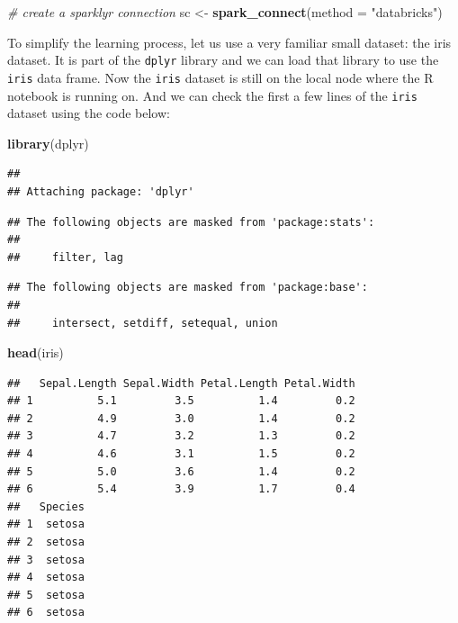 \documentclass[12pt,]{krantz}
\makeatletter
\newenvironment{Shaded}{\begin{snugshade}}{\end{snugshade}}
\newcommand{\CommentTok}[1]{\textcolor[rgb]{0.37,0.37,0.37}{\textit{#1}}}
\newcommand{\DataTypeTok}[1]{\textcolor[rgb]{0.27,0.27,0.27}{#1}}
\newcommand{\KeywordTok}[1]{\textcolor[rgb]{0.27,0.27,0.27}{\textbf{#1}}}
\newcommand{\NormalTok}[1]{#1}
\newcommand{\StringTok}[1]{\textcolor[rgb]{0.5,0.5,0.5}{#1}}
\newenvironment{kframe}{%
\medskip{}
\setlength{\fboxsep}{.8em}
 \def\at@end@of@kframe{}%
 \ifinner\ifhmode%
  \def\at@end@of@kframe{\end{minipage}}%
  \begin{minipage}{\columnwidth}%
 \fi\fi%
 \def\FrameCommand##1{\hskip\@totalleftmargin \hskip-\fboxsep
 \colorbox{shadecolor}{##1}\hskip-\fboxsep
     \hskip-\linewidth \hskip-\@totalleftmargin \hskip\columnwidth}%
 \MakeFramed {\advance\hsize-\width
   \@totalleftmargin\z@ \linewidth\hsize
   \@setminipage}}%
 {\par\unskip\endMakeFramed%
 \at@end@of@kframe}
\renewenvironment{Shaded}{\begin{kframe}}{\end{kframe}}
\makeatother
\begin{document}
\begin{Shaded}
\begin{Highlighting}[]
\CommentTok{# create a sparklyr connection}
\NormalTok{sc <-}\StringTok{ }\KeywordTok{spark_connect}\NormalTok{(}\DataTypeTok{method =} \StringTok{"databricks"}\NormalTok{)}
\end{Highlighting}
\end{Shaded}

To simplify the learning process, let us use a very familiar small dataset: the iris dataset. It is part of the \texttt{dplyr} library and we can load that library to use the \texttt{iris} data frame. Now the \texttt{iris} dataset is still on the local node where the R notebook is running on. And we can check the first a few lines of the \texttt{iris} dataset using the code below:

\begin{Shaded}
\begin{Highlighting}[]
\KeywordTok{library}\NormalTok{(dplyr)}
\end{Highlighting}
\end{Shaded}

\begin{verbatim}
## 
## Attaching package: 'dplyr'
\end{verbatim}

\begin{verbatim}
## The following objects are masked from 'package:stats':
## 
##     filter, lag
\end{verbatim}

\begin{verbatim}
## The following objects are masked from 'package:base':
## 
##     intersect, setdiff, setequal, union
\end{verbatim}

\begin{Shaded}
\begin{Highlighting}[]
\KeywordTok{head}\NormalTok{(iris)}
\end{Highlighting}
\end{Shaded}

\begin{verbatim}
##   Sepal.Length Sepal.Width Petal.Length Petal.Width
## 1          5.1         3.5          1.4         0.2
## 2          4.9         3.0          1.4         0.2
## 3          4.7         3.2          1.3         0.2
## 4          4.6         3.1          1.5         0.2
## 5          5.0         3.6          1.4         0.2
## 6          5.4         3.9          1.7         0.4
##   Species
## 1  setosa
## 2  setosa
## 3  setosa
## 4  setosa
## 5  setosa
## 6  setosa
\end{verbatim}
\end{document}
